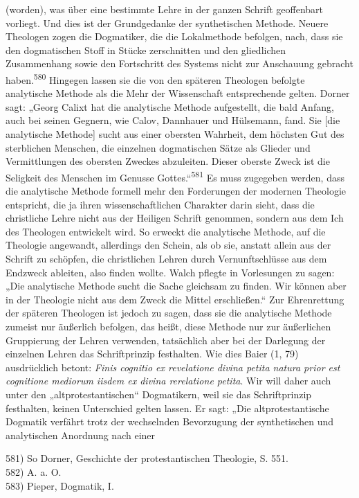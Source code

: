 (worden), was über eine bestimmte Lehre in der ganzen Schrift geoffenbart vorliegt. Und dies ist der Grundgedanke der synthetischen Methode. Neuere Theologen zogen die Dogmatiker, die die Lokalmethode befolgen, nach, dass sie den dogmatischen Stoff in Stücke zerschnitten und den gliedlichen Zusammenhang sowie den Fortschritt des Systems nicht zur Anschauung gebracht haben.\textsuperscript{580}
Hingegen lassen sie die von den späteren Theologen befolgte analytische Methode als die Mehr der Wissenschaft entsprechende gelten. Dorner sagt: „Georg Calixt hat die analytische Methode aufgestellt, die bald Anfang, auch bei seinen Gegnern, wie Calov, Dannhauer und Hülsemann, fand. Sie [die analytische Methode] sucht aus einer obersten Wahrheit, dem höchsten Gut des sterblichen Menschen, die einzelnen dogmatischen Sätze als Glieder und Vermittlungen des obersten Zweckes abzuleiten. Dieser oberste Zweck ist die Seligkeit des Menschen im Genusse Gottes.“\textsuperscript{581} Es muss zugegeben werden, dass die analytische Methode formell mehr den Forderungen der modernen Theologie entspricht, die ja ihren wissenschaftlichen Charakter darin sieht, dass die christliche Lehre nicht aus der Heiligen Schrift genommen, sondern aus dem Ich des Theologen entwickelt wird. So erweckt die analytische Methode, auf die Theologie angewandt, allerdings den Schein, als ob sie, anstatt allein aus der Schrift zu schöpfen, die christlichen Lehren durch Vernunftschlüsse aus dem Endzweck ableiten, also finden wollte. Walch pflegte in Vorlesungen zu sagen: „Die analytische Methode sucht die Sache gleichsam zu finden. Wir können aber in der Theologie nicht aus dem Zweck die Mittel erschließen.“ Zur Ehrenrettung der späteren Theologen ist jedoch zu sagen, dass sie die analytische Methode zumeist nur äußerlich befolgen, das heißt, diese Methode nur zur äußerlichen Gruppierung der Lehren verwenden, tatsächlich aber bei der Darlegung der einzelnen Lehren das Schriftprinzip festhalten. Wie dies Baier (1, 79) ausdrücklich betont: \textit{Finis cognitio ex revelatione divina petita natura prior est cognitione mediorum iisdem ex divina rerelatione petita}. Wir will daher auch unter den „altprotestantischen“ Dogmatikern, weil sie das Schriftprinzip festhalten, keinen Unterschied gelten lassen. Er sagt: „Die altprotestantische Dogmatik verfährt trotz der wechselnden Bevorzugung der synthetischen und analytischen Anordnung nach einer
\vspace{1.5em}
\noindent\parbox{\linewidth}{\raggedright\footnotesize
581) So Dorner, Geschichte der protestantischen Theologie, S. 551.\\
582) A. a. O.\\
583) Pieper, Dogmatik, I.
}
